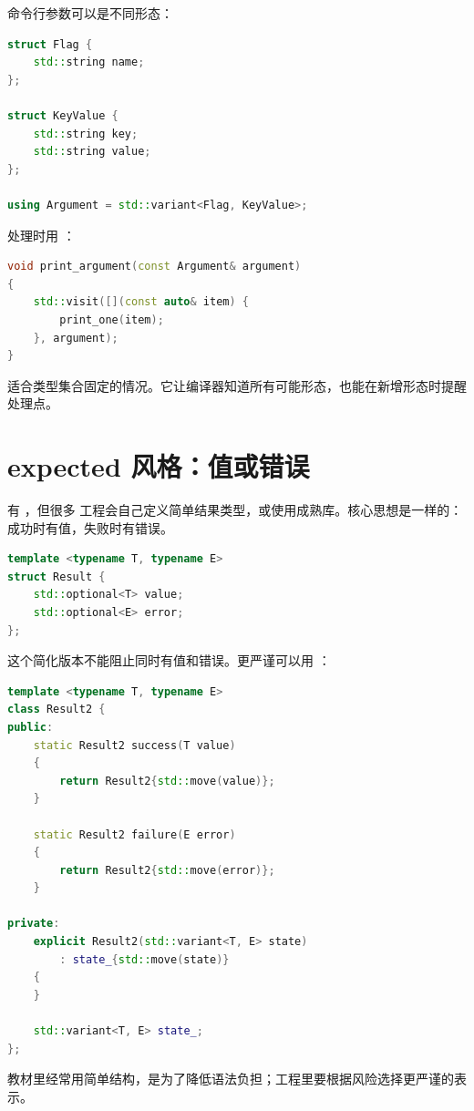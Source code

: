 命令行参数可以是不同形态：

\begin{lstlisting}[language=C++,caption={命令行值的 variant}]
struct Flag {
    std::string name;
};

struct KeyValue {
    std::string key;
    std::string value;
};

using Argument = std::variant<Flag, KeyValue>;
\end{lstlisting}

处理时用 ：

\begin{lstlisting}[language=C++,caption={访问 variant 参数}]
void print_argument(const Argument& argument)
{
    std::visit([](const auto& item) {
        print_one(item);
    }, argument);
}
\end{lstlisting}

 适合类型集合固定的情况。它让编译器知道所有可能形态，也能在新增形态时提醒处理点。

\section{expected 风格：值或错误}

 有 ，但很多  工程会自己定义简单结果类型，或使用成熟库。核心思想是一样的：成功时有值，失败时有错误。

\begin{lstlisting}[language=C++,caption={expected 风格结果}]
template <typename T, typename E>
struct Result {
    std::optional<T> value;
    std::optional<E> error;
};
\end{lstlisting}

这个简化版本不能阻止同时有值和错误。更严谨可以用 ：

\begin{lstlisting}[language=C++,caption={variant 表达二选一}]
template <typename T, typename E>
class Result2 {
public:
    static Result2 success(T value)
    {
        return Result2{std::move(value)};
    }

    static Result2 failure(E error)
    {
        return Result2{std::move(error)};
    }

private:
    explicit Result2(std::variant<T, E> state)
        : state_{std::move(state)}
    {
    }

    std::variant<T, E> state_;
};
\end{lstlisting}

教材里经常用简单结构，是为了降低语法负担；工程里要根据风险选择更严谨的表示。

